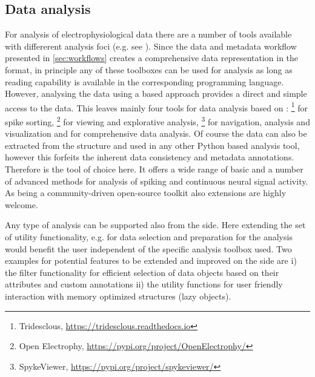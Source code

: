\subsection{Data analysis}
For analysis of electrophysiological data there are a number of tools available with differerent analysis foci (e.g. see \citet{Unakafova_2019}). Since the data and metadata workflow presented in \cref{sec:workflows} creates a comprehensive data representation in the  format, in principle any of these toolboxes can be used for analysis as long as  reading capability is available in the corresponding programming language. However, analysing the data using a  based approach provides a direct and simple access to the data. This leaves mainly four tools for data analysis based on : \footnote{Tridesclous, \url{https://tridesclous.readthedocs.io}} for spike sorting, \footnote{Open Electrophy, \url{https://pypi.org/project/OpenElectrophy/}} \citep{Garcia_2009} for viewing and explorative analysis, \footnote{SpykeViewer, \url{https://pypi.org/project/spykeviewer/}} for navigation, analysis and visualization and  for comprehensive data analysis. Of course the data can also be extracted from the  structure and used in any other Python based analysis tool, however this forfeits the inherent data consistency and metadata annotations. Therefore  is the tool of choice here. It offers a wide range of basic and a number of advanced methods for analysis of spiking and continuous neural signal activity. As  being a community-driven open-source toolkit also extensions are highly welcome.

Any type of analysis can be supported also from the  side. Here extending the set of utility functionality, e.g. for data selection and preparation for the analysis would benefit the user independent of the specific analysis toolbox used. Two examples for potential features to be extended and improved on the  side are i) the filter functionality for efficient selection of data objects based on their attributes and custom annotations ii) the utility functions for user friendly interaction with memory optimized  structures (lazy objects).

